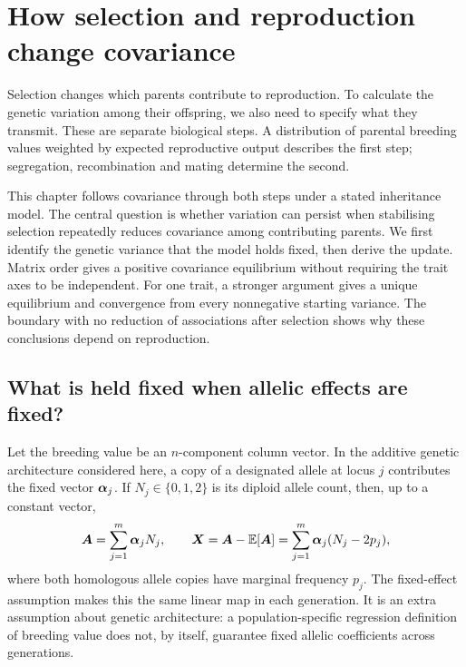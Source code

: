 \chapter{How selection and reproduction change covariance}
\label{inheritance:chapter}

Selection changes which parents contribute to reproduction. To calculate the
genetic variation among their offspring, we also need to specify what they
transmit. These are separate biological steps. A distribution of parental
breeding values weighted by expected reproductive output describes the first
step; segregation, recombination and mating determine the second.

This chapter follows covariance through both steps under a stated inheritance
model. The central question is whether variation can persist when stabilising
selection repeatedly reduces covariance among contributing parents. We first
identify the genetic variance that the model holds fixed, then derive the
update. Matrix order gives a positive covariance equilibrium without requiring
the trait axes to be independent. For one trait, a stronger argument gives a
unique equilibrium and convergence from every nonnegative starting variance.
The boundary with no reduction of associations after selection shows why
these conclusions depend on reproduction.

\section{What is held fixed when allelic effects are fixed?}
\label{inheritance:genic}

Let the breeding value be an $n$-component column vector. In the additive
genetic architecture considered here, a copy of a designated allele at locus
$j$ contributes the fixed vector $\boldsymbol{\alpha}_j$. If $N_j\in\{0,1,2\}$ is
its diploid allele count, then, up to a constant vector,
\begin{equation}
  \boldsymbol{A}=\sum_{j=1}^{m}\boldsymbol{\alpha}_jN_j,
  \qquad
  \boldsymbol{X}=\boldsymbol{A}-\mathbb E[\boldsymbol{A}]
     =\sum_{j=1}^{m}\boldsymbol{\alpha}_j(N_j-2p_j),
  \label{inheritance:additive-map}
\end{equation}
where both homologous allele copies have marginal frequency $p_j$.
The fixed-effect assumption makes this the same linear map in each
generation. It is an extra assumption about genetic architecture: a
population-specific regression definition of breeding value does not, by
itself, guarantee fixed allelic coefficients across generations.

